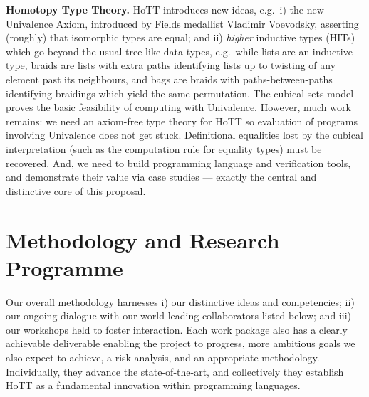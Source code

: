 \documentclass[a4paper,11pt]{article}
\newcommand{\eg}{{e.g.}\ }
\begin{document}
{\bf Homotopy Type Theory.} HoTT introduces new ideas, \eg i) the new
Univalence Axiom, introduced by Fields medallist Vladimir Voevodsky,
asserting (roughly) that isomorphic types are equal; and ii)
\emph{higher} inductive types (HITs) which go beyond the usual
tree-like data types, \eg while lists are an inductive type, braids
are lists with extra paths identifying lists up to twisting of any
element past its neighbours, and bags are braids with
paths-between-paths identifying braidings which yield the same
permutation.  The cubical sets model~\cite{BezemM:cubsmt, nominal}
proves the basic feasibility of computing with Univalence.  However,
much work remains: we need an axiom-free type theory for HoTT so
evaluation of programs involving Univalence does not get stuck. Definitional equalities lost by the
cubical interpretation (such as the computation rule for equality
types) must be recovered. And, we need to build programming language
and verification tools, and demonstrate their value via case studies
--- exactly the central and distinctive core of this proposal.

\vspace*{-0.2in}

\section{Methodology and Research Programme}
\vspace*{-0.1in}
Our overall methodology harnesses i) our distinctive ideas and
competencies; ii) our ongoing dialogue with our world-leading
collaborators listed below; and iii) our workshops held to foster
interaction. Each work package also has a clearly achievable
deliverable enabling the project to progress, more ambitious goals we
also expect to achieve, a risk analysis, and an appropriate methodology. Individually, they advance the state-of-the-art, and
collectively they establish HoTT as a fundamental innovation within
programming languages.
\end{document}
